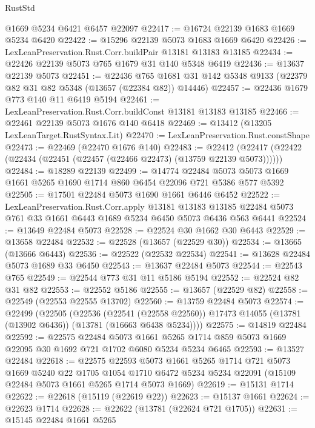 \begin{lexlean}{RustStd}
\begin{coremodule}
    @1669
    @5234
    @6421
    @6457
    @22097
@22417 := @16724 @22139 @1683 @1669 @5234 @6420
@22422 := @15296 @22139 @5073 @1683 @1669 @6420
@22426 := LexLeanPreservation.Rust.Corr.buildPair @13181 @13183 @13185
@22434 := @22426 @22139 @5073 @765 @1679 @31 @140 @5348 @6419
@22436 := @13637 @22139 @5073
@22451 := @22436
    @765
    @1681
    @31
    @142
    @5348
    @9133
    (@22379 @82 @31 @82 @5348 (@13657 (@22384 @82)) @14446)
@22457 := @22436 @1679 @773 @140 @11 @6419 @5194
@22461 := LexLeanPreservation.Rust.Corr.buildConst @13181 @13183 @13185
@22466 := @22461 @22139 @5073 @1676 @140 @6418
@22469 := @13412 (@13205 LexLeanTarget.RustSyntax.Lit)
@22470 := LexLeanPreservation.Rust.constShape
@22473 := @22469 (@22470 @1676 @140)
@22483 := @22412 (@22417 (@22422 (@22434 (@22451 (@22457 (@22466 @22473) (@13759 @22139 @5073))))))
@22484 := @18289 @22139
@22499 := @14774
    @22484
    @5073
    @5073
    @1669
    @1661
    @5265
    @1690
    @1714
    @860
    @6454
    @22096
    @721
    @5386
    @577
    @5392
@22505 := @17501 @22484 @5073 @1690 @1661 @6446 @6452
@22522 := LexLeanPreservation.Rust.Corr.apply
    @13181
    @13183
    @13185
    @22484
    @5073
    @761
    @33
    @1661
    @6443
    @1689
    @5234
    @6450
    @5073
    @6436
    @563
    @6441
@22524 := @13649 @22484 @5073
@22528 := @22524 @30 @1662 @30 @6443
@22529 := @13658 @22484
@22532 := @22528 (@13657 (@22529 @30))
@22534 := @13665 (@13666 @6443)
@22536 := @22522 (@22532 @22534)
@22541 := @13628 @22484 @5073 @1689 @33 @6450
@22543 := @13637 @22484 @5073
@22544 := @22543 @765
@22549 := @22544 @773 @31 @11 @5186 @5194
@22552 := @22524 @82 @31 @82
@22553 := @22552 @5186
@22555 := @13657 (@22529 @82)
@22558 := @22549 (@22553 @22555 @13702)
@22560 := @13759 @22484 @5073
@22574 := @22499
    (@22505
      (@22536
        (@22541 (@22558 @22560))
        @17473
        @14055
        (@13781 (@13902 @6436))
        (@13781 (@16663 @6438 @5234))))
@22575 := @14819 @22484
@22592 := @22575
    @22484
    @5073
    @1661
    @5265
    @1714
    @859
    @5073
    @1669
    @22095
    @30
    @1692
    @721
    @1702
    @6080
    @5234
    @5234
    @6465
@22593 := @13527 @22484
@22618 := @22575
    @22593
    @5073
    @1661
    @5265
    @1714
    @721
    @5073
    @1669
    @5240
    @22
    @1705
    @1054
    @1710
    @6472
    @5234
    @5234
    @22091
    (@15109 @22484 @5073 @1661 @5265 @1714 @5073 @1669)
@22619 := @15131 @1714
@22622 := @22618 (@15119 (@22619 @22))
@22623 := @15137 @1661
@22624 := @22623 @1714
@22628 := @22622 (@13781 (@22624 @721 @1705))
@22631 := @15145 @22484 @1661 @5265

\end{coremodule}
\end{lexlean}
